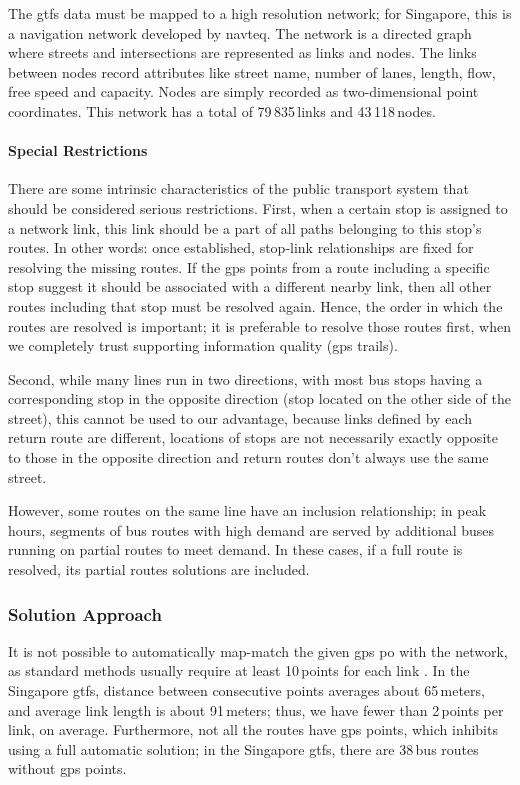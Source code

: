 The \gls{gtfs} data must be mapped to a high resolution network; for Singapore, this is a navigation network developed by \gls{navteq}. The network is a directed graph where streets and intersections are represented as links and nodes. The links between nodes record attributes like street name, number of lanes, length, flow, free speed and capacity. Nodes are simply recorded as two-dimensional point coordinates. This network has a total of 79\,835\,links and 43\,118\,nodes.

\paragraph{Special Restrictions}

There are some intrinsic characteristics of the public transport system that should be considered serious restrictions. First, when a certain stop is assigned to a network link, this link should be a part of all paths belonging to this stop's routes. In other words: once established, stop-link relationships are fixed for resolving the missing routes. If the \gls{gps} points from a route including a specific stop suggest it should be associated with a different nearby link, then all other routes including that stop must be resolved again. Hence, the order in which the routes are resolved is important; it is preferable to resolve those routes first, when we completely trust supporting information quality (\eg \gls{gps} trails).

Second, while many lines run in two directions, with most bus stops having a corresponding stop in the opposite direction (stop located on the other side of the street), this cannot be used to our advantage, because links defined by each return route are different, locations of stops are not necessarily exactly opposite to those in the opposite direction and return routes  don't always use the same street.

However, some routes on the same line have an inclusion relationship; in peak hours, segments of bus routes with high demand are served by additional buses running on partial routes to meet demand. In these cases, if a full route is resolved, its partial routes solutions are included.

\subsubsection{Solution Approach}
It is not possible to automatically map-match the given \gls{gps} po with the network, as standard methods usually require at least 10\,points for each link \citep[][]{SchuesslerAxhausen_TechRep_IVT_2009}. In the Singapore \gls{gtfs}, distance between consecutive points averages about 65\,meters, and average link length is about 91\,meters; thus, we have fewer than 2\,points per link, on average. Furthermore, not all the routes have \gls{gps} points, which inhibits using a full automatic solution; in the Singapore \gls{gtfs}, there are 38\,bus routes without \gls{gps} points.

